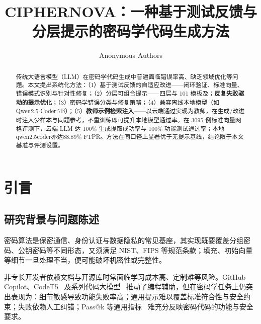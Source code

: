 \documentclass[runningheads]{llncs}
\begin{document}
\title{CIPHERNOVA：一种基于测试反馈与分层提示的密码学代码生成方法}

\newif\ifanonymized
\anonymizedtrue      %

\ifanonymized
\author{Anonymous Authors}
\else
\author{Jia-Yi He\inst{1} \and Xiao Lan\thanks{Corresponding author: lanxiao@scu.edu.cn}}
\institute{School of Cyber Science and Engineering, Sichuan University, Chengdu, Sichuan, China\\
\email{2022141500268@stu.scu.edu.cn, lanxiao@scu.edu.cn}}
\authorrunning{J.\ He and X.\ Lan}
\fi
\maketitle

\begin{abstract}
传统大语言模型（LLM）在密码学代码生成中普遍面临错误率高、缺乏领域优化等问题。本文提出系统化方法：（1）基于测试反馈的自适应改进——闭环验证、标准向量、错误模式识别与针对性修复；（2）分层可组合提示——四层与 101 模板及；\textbf{反复失败驱动的提示优化}；（3）密码学错误分类与修复策略；（4）兼容离线本地模型（如 Qwen2.5-Coder:7B）；（5）\textbf{教师示例检索注入}——以云端通过实现为教师，在生成/改进时注入少样本与同题参考，不重训练即可提升本地模型通过率。在 3095 例标准向量网格评测下，云端 LLM 达 100\% 生成提取成功率与 100\% 功能测试通过率；本地qwen2.5coder亦达88.89\% FTPR。方法在同口径上显著优于无提示基线，结论限于本文基准与评测设置。
\end{abstract}


\section{引言}
\subsection{研究背景与问题陈述}
密码算法是保密通信、身份认证与数据隐私的常见基座，其实现既要覆盖分组密码、公钥密码等不同形态，又须满足 NIST、FIPS 等规范条款；填充、初始向量等细节一旦处理不当，便可能破坏机密性或完整性。

非专长开发者依赖文档与开源库时常面临学习成本高、定制难等风险。GitHub Copilot、CodeT5~\cite{codet5} 及系列代码大模型~\cite{codex,codellama,deepseekcoder,starcoder} 推动了编程辅助，但在密码学任务上仍突出表现为：细节敏感导致功能失败率高；通用提示难以覆盖标准符合性与安全约束；失败依赖人工纠错；Pass@k 等通用指标~\cite{codex} 难充分反映密码代码的功能与安全要求。
\end{document}
